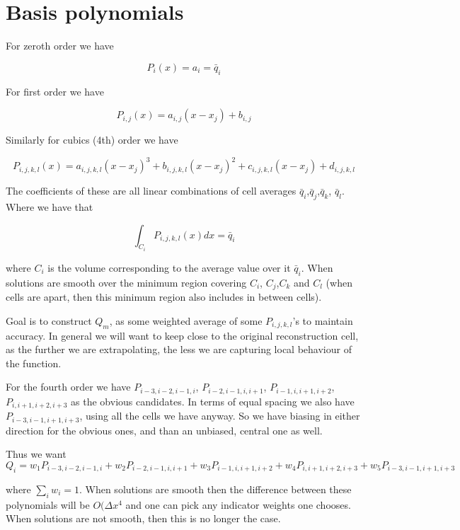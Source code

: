 \documentclass{article}
\begin{document}
\section{Basis polynomials}

For zeroth order we have

\begin{equation}
P_i(x) = a_i = \bar{q}_i
\end{equation}

For first order we have

\begin{equation}
P_{i,j}(x) = a_{i,j}\left(x - x_j\right) + b_{i,j} 
\end{equation}

Similarly for cubics (4th) order we have

\begin{equation}
P_{i,j,k,l}(x) = a_{i,j,k,l}\left(x - x_j\right)^3 + b_{i,j,k,l}\left(x - x_j\right)^2 + c_{i,j,k,l}\left(x - x_j\right) + d_{i,j,k,l}
\end{equation}

The coefficients of these are all linear combinations of cell averages $\bar{q}_i$,$\bar{q}_j$,$\bar{q}_k$, $\bar{q}_l$. Where we have that

\begin{equation}
\int_{C_i}  P_{i,j,k,l}(x) dx  =\bar{q}_i 
\end{equation}

where $C_i$ is the volume corresponding to the average value over it $\bar{q}_i $. When solutions are smooth over the minimum region covering $C_i$, $C_j$,$C_k$ and $C_l$ (when cells are apart, then this minimum region also includes in between cells). 

Goal is to construct $Q_m$, as some weighted average of some $P_{i,j,k,l}$'s to maintain accuracy. In general we will want to keep close to the original reconstruction cell, as the further we are extrapolating, the less we are capturing local behaviour of the function.

For the fourth order we have $P_{i-3,i-2,i-1,i}$, $P_{i-2,i-1,i,i+1}$, $P_{i-1,i,i+1,i+2}$, $P_{i, i+1,i +2, i+3}$ as the obvious candidates. In terms of equal spacing we also have 
$P_{i-3, i-1,i +1, i+3}$, using all the cells we have anyway. So we have biasing in either direction for the obvious ones, and than an unbiased, central one as well. 

Thus we want 
\begin{equation}
Q_i = w_{1} P_{i-3,i-2,i-1,i}+  w_{2} P_{i-2,i-1,i,i+1} + w_3P_{i-1,i,i+1,i+2} + w_4 P_{i, i+1,i +2, i+3} + w_5  P_{i-3, i-1,i +1, i+3}
\end{equation}

where $\sum_i w_i = 1$. When solutions are smooth then the difference between these polynomials will be $O(\Delta x ^4$ and one can pick any indicator weights one chooses. When solutions are not smooth, then this is no longer the case. 
\end{document}
